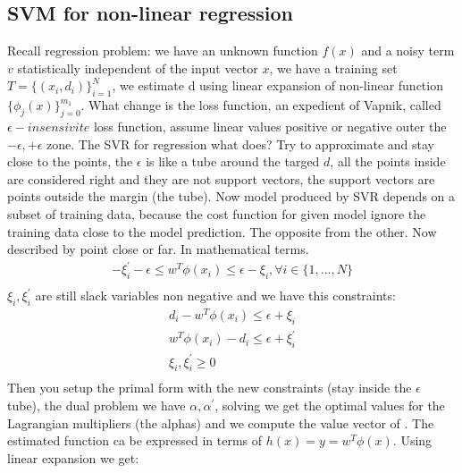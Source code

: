 \documentclass[12pt]{book}
\begin{document}
\subsection{SVM for non-linear regression}
Recall regression problem: we have an unknown function $f(x)$ and a noisy term $v$ statistically independent of the input vector $x$, we have a training set $T = \{(x_i, d_i)\}_{i=1}^N$, we estimate d using linear expansion of non-linear function $\{\phi_j(x)\}_{j=0}^{m_1}$.\newline
What change is the loss function, an expedient of Vapnik, called $\epsilon-insensivite$ loss function, assume linear values positive or negative outer the $-\epsilon, +\epsilon$ zone. \newline
The SVR for regression what does? Try to approximate and stay close to the points, the $\epsilon$ is like a tube around the targed $d$, all the points inside are considered right and they are not support vectors, the support vectors are points outside the margin (the tube).\newline
Now model produced by SVR depends on a subset of training data, because the cost function for given model ignore the training data close to the model prediction. The opposite from the other. Now described by point close or far. In mathematical terms.
\begin{equation}
	\begin{aligned}
		-\xi_i^{'} - \epsilon \leq w^T\phi(x_i) \leq \epsilon - \xi_i,  \forall i \in \{1,...,N\}\\
	\end{aligned}
\end{equation}
$\xi_i, \xi_i^{'}$ are still slack variables non negative and we have this constraints:
\begin{equation}
	\begin{aligned}
		d_i - w^T\phi(x_i) \leq \epsilon + \xi_i \\
		w^T\phi(x_i) - d_i \leq \epsilon + \xi_i^{'} \\
		\xi_i, \xi_i^{'} \geq 0 \\
	\end{aligned}
\end{equation}
Then you setup the primal form with the new constraints (stay inside the $\epsilon$ tube), the dual problem we have $\alpha, \alpha^{'}$, solving we get the optimal values for the Lagrangian multipliers (the alphas) and we compute the value vector of . \newline
The estimated function ca be expressed in terms of $h(x) = y = w^T\phi(x)$. Using linear expansion we get:
\end{document}
